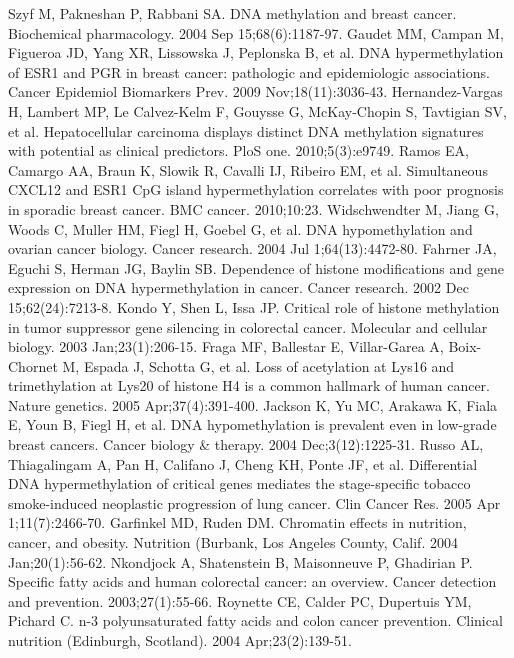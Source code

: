 \begin{thebibliography}{12} 
		Szyf M, Pakneshan P, Rabbani SA. DNA methylation and breast cancer. Biochemical pharmacology. 2004 Sep 15;68(6):1187-97. 
		Gaudet MM, Campan M, Figueroa JD, Yang XR, Lissowska J, Peplonska B, et al. DNA hypermethylation of ESR1 and PGR in breast cancer: pathologic and epidemiologic associations. Cancer Epidemiol Biomarkers Prev. 2009 Nov;18(11):3036-43. 
		Hernandez-Vargas H, Lambert MP, Le Calvez-Kelm F, Gouysse G, McKay-Chopin S, Tavtigian SV, et al. Hepatocellular carcinoma displays distinct DNA methylation signatures with potential as clinical predictors. PloS one. 2010;5(3):e9749. 
		Ramos EA, Camargo AA, Braun K, Slowik R, Cavalli IJ, Ribeiro EM, et al. Simultaneous CXCL12 and ESR1 CpG island hypermethylation correlates with poor prognosis in sporadic breast cancer. BMC cancer. 2010;10:23. 
		Widschwendter M, Jiang G, Woods C, Muller HM, Fiegl H, Goebel G, et al. DNA hypomethylation and ovarian cancer biology. Cancer research. 2004 Jul 1;64(13):4472-80. 
		Fahrner JA, Eguchi S, Herman JG, Baylin SB. Dependence of histone modifications and gene expression on DNA hypermethylation in cancer. Cancer research. 2002 Dec 15;62(24):7213-8. 
		Kondo Y, Shen L, Issa JP. Critical role of histone methylation in tumor suppressor gene silencing in colorectal cancer. Molecular and cellular biology. 2003 Jan;23(1):206-15. 
		Fraga MF, Ballestar E, Villar-Garea A, Boix-Chornet M, Espada J, Schotta G, et al. Loss of acetylation at Lys16 and trimethylation at Lys20 of histone H4 is a common hallmark of human cancer. Nature genetics. 2005 Apr;37(4):391-400. 
		Jackson K, Yu MC, Arakawa K, Fiala E, Youn B, Fiegl H, et al. DNA hypomethylation is prevalent even in low-grade breast cancers. Cancer biology \& therapy. 2004 Dec;3(12):1225-31. 
		Russo AL, Thiagalingam A, Pan H, Califano J, Cheng KH, Ponte JF, et al. Differential DNA hypermethylation of critical genes mediates the stage-specific tobacco smoke-induced neoplastic progression of lung cancer. Clin Cancer Res. 2005 Apr 1;11(7):2466-70. 
		Garfinkel MD, Ruden DM. Chromatin effects in nutrition, cancer, and obesity. Nutrition (Burbank, Los Angeles County, Calif. 2004 Jan;20(1):56-62. 
		Nkondjock A, Shatenstein B, Maisonneuve P, Ghadirian P. Specific fatty acids and human colorectal cancer: an overview. Cancer detection and prevention. 2003;27(1):55-66. 
		Roynette CE, Calder PC, Dupertuis YM, Pichard C. n-3 polyunsaturated fatty acids and colon cancer prevention. Clinical nutrition (Edinburgh, Scotland). 2004 Apr;23(2):139-51. 

\end{thebibliography}
